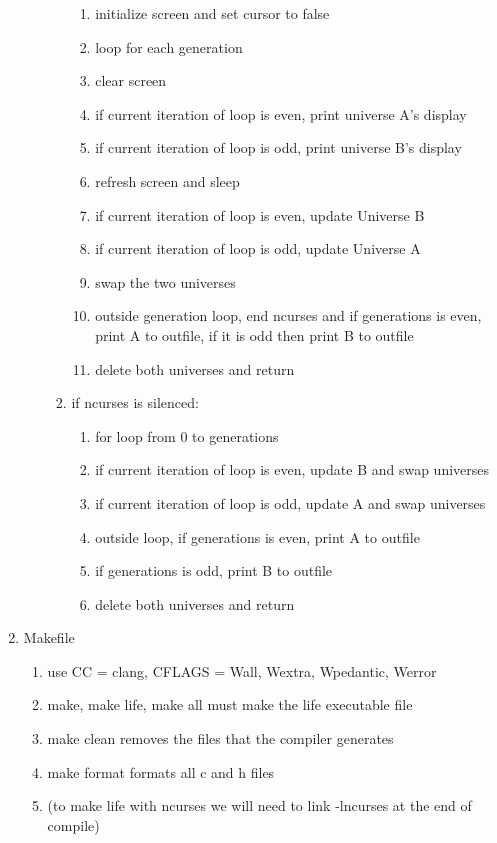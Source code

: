 \documentclass[11pt]{article}
\begin{document}
\begin{enumerate}
\begin{enumerate}
\begin{enumerate}
\begin{enumerate}
				\item initialize screen and set cursor to false
				\item loop for each generation
				\item clear screen
				\item if current iteration of loop is even, print universe A's display
				\item if current iteration of loop is odd, print universe B's display
				\item  refresh screen and sleep
				\item if current iteration of loop is even, update Universe B
				\item if current iteration of loop is odd, update Universe A
				\item swap the two universes
				\item outside generation loop, end ncurses and if generations is even, print A to outfile, if it is odd then print B to outfile
				\item delete both universes and return
				\end{enumerate}
			\item if ncurses is silenced:
				\begin{enumerate}
				\item for loop from 0 to generations
				\item if current iteration of loop is even, update B and swap universes
				\item if current iteration of loop is odd, update A and swap universes
				\item outside loop, if generations is even, print A to outfile
				\item if generations is odd, print B to outfile
				\item delete both universes and return
				\end{enumerate}
			\end{enumerate}
	\end{enumerate}
	\item Makefile
	\begin{enumerate}
		\item use CC = clang, CFLAGS = Wall, Wextra, Wpedantic, Werror
		\item make, make life, make all must make the life executable file
		\item make clean removes the files that the compiler generates
		\item make format formats all c and h files
		\item (to make life with ncurses we will need to link -lncurses at the end of compile)

\end{enumerate}
\end{enumerate}
\end{document}

